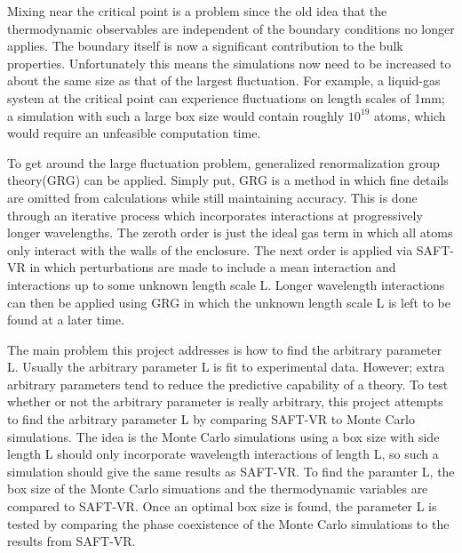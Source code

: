Mixing near the critical point is a problem since the old idea that the thermodynamic observables are independent of the boundary conditions no longer applies. The boundary itself is now a significant contribution to the bulk properties. Unfortunately this means the simulations now need to be increased to about the same size as that of the largest fluctuation. For example, a liquid-gas system at the critical point can experience fluctuations on length scales of 1mm; a simulation with such a large box size would contain roughly $10^{19}$ atoms, which would require an unfeasible computation time.

To get around the large fluctuation problem, generalized renormalization group theory(GRG) can be applied. Simply put, GRG is a method in which fine details are omitted from calculations while still maintaining accuracy. This is done through an iterative process which incorporates interactions at progressively longer wavelengths. The zeroth order is just the ideal gas term in which all atoms only interact with the walls of the enclosure. The next order is applied via SAFT-VR in which perturbations are made to include a mean interaction and interactions up to some unknown length scale L. Longer wavelength interactions can then be applied using GRG in which the unknown length scale L is left to be found at a later time.

The main problem this project addresses is how to find the arbitrary parameter L. Usually the arbitrary parameter L is fit to experimental data. However; extra arbitrary parameters tend to reduce the predictive capability of a theory. To test whether or not the arbitrary parameter is really arbitrary, this project attempts to find the arbitrary parameter L by comparing SAFT-VR to Monte Carlo simulations. The idea is the Monte Carlo simulations using a box size with side length L should only incorporate wavelength interactions of length L, so such a simulation should give the same results as SAFT-VR. To find the paramter L, the box size of the Monte Carlo simuations and the thermodynamic variables are compared to SAFT-VR. Once an optimal box size is found, the parameter L is tested by comparing the phase coexistence of the Monte Carlo simulations to the results from SAFT-VR.